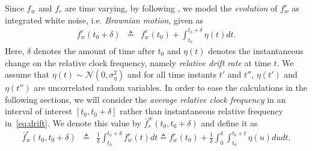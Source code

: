 \documentclass[10pt,journal,compsoc]{IEEEtran}
\begin{document}
Since $f_w$ and $f_r$ are time varying, by following 
\cite{Zhong:2011:On-demand,Huang:2013:PSR}, we model the 
\emph{evolution} 
of $f_w^r$ as 
integrated white noise, i.e. \emph{Brownian motion}, given as
\begin{eqnarray}
f_{w}^{r}(t_{0}+\delta) & \triangleq & 
f_{w}^{r}(t_{0})+\int_{t_{0}}^{t_{0}+\delta}\eta(t)dt.\label{eq:drift}
\end{eqnarray}
Here, $\delta$ denotes the amount of time after $t_0$ and $\eta(t)$ denotes 
the instantaneous change on the relative clock frequency, namely 
\emph{relative drift rate} at time $t$. We assume that 
$\eta(t)\sim\mathcal{N}(0,\sigma_{\eta}^{2})$ and for all 
time instants $t'$ and $t''$, $\eta(t')$ and $\eta(t'')$ are uncorrelated 
random variables. In order to ease the calculations in the following sections, 
we will consider the \emph{average relative clock frequency} in an interval of 
interest $[t_0,t_0+\delta]$ rather than instantaneous relative frequency 
in~\eqref{eq:drift}. We denote this value by $\bar{f}_{r}^{w}(t_0,t_0+\delta)$ 
and define it as 
\begin{eqnarray}
\bar{f}_{w}^{r}(t_0,t_0\!+\!\delta) &\!\!\!\!\! \triangleq\!\!\!\!\! & 
\frac{1}{\delta}\!\!\int_{t_0}^{t_0+\delta}\!\!\!\!\!\!\!\!\!\!\!\! 
f_w^r(t)dt \triangleq
f_{w}^{r}(t_{0})\!+\!\frac{1}{\delta}\!\!\int_{0}^{\delta}\!\!\int_{t_{0}}^{t_{0}+t}\!\!\!\!\!\!\!\!\!\!\!\eta(u)dudt.
\label{eq:drift_relation}
\end{eqnarray}
\end{document}
